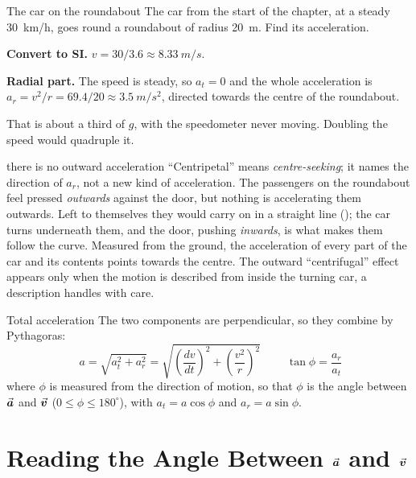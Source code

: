 \begin{exbox}{The car on the roundabout}
The car from the start of the chapter, at a steady \SI{30}{km/h}, goes round a roundabout of
radius \SI{20}{m}. Find its acceleration.

 \textbf{Convert to SI.} $v=30/3.6\approx\SI{8.33}{m/s}$.

 \textbf{Radial part.} The speed is steady, so $a_t=0$ and the whole acceleration is
$a_r=v^2/r=69.4/20\approx\SI{3.5}{m/s^2}$, directed towards the centre of the roundabout.

That is about a third of $g$, with the speedometer never moving. Doubling the speed would quadruple it.
\end{exbox}

\begin{trapbox}{there is no outward acceleration}
``Centripetal'' means \emph{centre-seeking}; it names the direction of $a_r$, not a new kind of
acceleration. The passengers on the roundabout feel pressed \emph{outwards} against the door, but
nothing is accelerating them outwards. Left to themselves they would carry on in a straight line
(); the car turns underneath them, and the door, pushing \emph{inwards}, is what makes
them follow the curve. Measured from the ground, the acceleration of every part of the car and its
contents points towards the centre. The outward ``centrifugal'' effect appears only when the motion is
described from inside the turning car, a description  handles with care.
\end{trapbox}

\begin{keybox}{Total acceleration}
The two components are perpendicular, so they combine by Pythagoras:
\[
\boxed{\;a=\sqrt{a_t^{2}+a_r^{2}}=\sqrt{\left(\frac{dv}{dt}\right)^{2}+\left(\frac{v^{2}}{r}\right)^{2}}\;}
\qquad
\tan\phi=\frac{a_r}{a_t}
\]
where $\phi$ is measured from the direction of motion, so that $\phi$ is the angle between $\vec{\bm{a}}$ and
$\vec{\bm{v}}$ ($0\le\phi\le180^\circ$), with $a_t=a\cos\phi$ and $a_r=a\sin\phi$.
\end{keybox}

\section{\texorpdfstring{Reading the Angle Between $\vec{\bm{a}}$ and $\vec{\bm{v}}$}{Reading the Angle Between a and v}}\label{sec:angleav}

